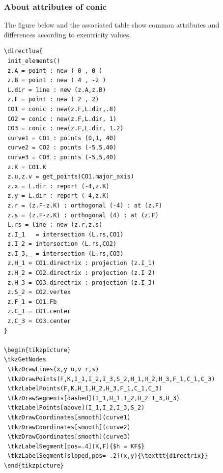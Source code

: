 \subsubsection{About attributes of conic} %
\label{ssub:about_attributes_of_conic}

The figure below and the associated table show common attributes and differences according to exentricity values.

\begin{minipage}{.5\textwidth}
\begin{Verbatim}
\directlua{
 init_elements()
 z.A = point : new ( 0 , 0 )
 z.B = point : new ( 4 , -2 )
 L.dir = line : new (z.A,z.B)
 z.F = point : new ( 2 , 2)
 CO1 = conic : new(z.F,L.dir,.8)
 CO2 = conic : new(z.F,L.dir, 1)
 CO3 = conic : new(z.F,L.dir, 1.2)
 curve1 = CO1 : points (0,1, 40)
 curve2 = CO2 : points (-5,5,40)
 curve3 = CO3 : points (-5,5,40)
 z.K = CO1.K
 z.u,z.v = get_points(CO1.major_axis)
 z.x = L.dir : report (-4,z.K)
 z.y = L.dir : report ( 4,z.K)
 z.r = (z.F-z.K) : orthogonal (-4) : at (z.F)
 z.s = (z.F-z.K) : orthogonal (4) : at (z.F)
 L.rs = line : new (z.r,z.s)
 z.I_1   = intersection (L.rs,CO1)
 z.I_2 = intersection (L.rs,CO2)
 z.I_3,_ = intersection (L.rs,CO3)
 z.H_1 = CO1.directrix : projection (z.I_1)
 z.H_2 = CO2.directrix : projection (z.I_2)
 z.H_3 = CO3.directrix : projection (z.I_3)
 z.S_2 = CO2.vertex
 z.F_1 = CO1.Fb
 z.C_1 = CO1.center
 z.C_3 = CO3.center
}

\begin{tikzpicture}
\tkzGetNodes
 \tkzDrawLines(x,y u,v r,s)
 \tkzDrawPoints(F,K,I_1,I_2,I_3,S_2,H_1,H_2,H_3,F_1,C_1,C_3)
 \tkzLabelPoints(F,K,H_1,H_2,H_3,F_1,C_1,C_3)
 \tkzDrawSegments[dashed](I_1,H_1 I_2,H_2 I_3,H_3)
 \tkzLabelPoints[above](I_1,I_2,I_3,S_2)
 \tkzDrawCoordinates[smooth](curve1)
 \tkzDrawCoordinates[smooth](curve2)
 \tkzDrawCoordinates[smooth](curve3)
 \tkzLabelSegment[pos=.4](K,F){$h = KF$}
 \tkzLabelSegment[sloped,pos=-.2](x,y){\texttt{directrix}}
\end{tikzpicture}
\end{Verbatim}
\end{minipage}
